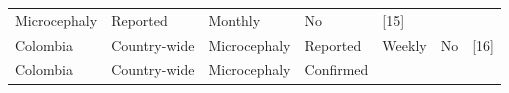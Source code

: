 \documentclass[10pt,letterpaper]{article}
\begin{document}
\begin{longtable}[]{@{}lllllll@{}}
\begin{minipage}[t]{0.08\columnwidth}
Microcephaly\strut
\end{minipage} & \begin{minipage}[t]{0.17\columnwidth}\raggedright\strut
Reported\strut
\end{minipage} & \begin{minipage}[t]{0.04\columnwidth}\raggedright\strut
Monthly\strut
\end{minipage} & \begin{minipage}[t]{0.04\columnwidth}\raggedright\strut
No\strut
\end{minipage} & \begin{minipage}[t]{0.08\columnwidth}\raggedright\strut
{[}15{]}\strut
\end{minipage}\tabularnewline
\begin{minipage}[t]{0.03\columnwidth}\raggedright\strut
Colombia\strut
\end{minipage} & \begin{minipage}[t]{0.37\columnwidth}\raggedright\strut
Country-wide\strut
\end{minipage} & \begin{minipage}[t]{0.08\columnwidth}\raggedright\strut
Microcephaly\strut
\end{minipage} & \begin{minipage}[t]{0.17\columnwidth}\raggedright\strut
Reported\strut
\end{minipage} & \begin{minipage}[t]{0.04\columnwidth}\raggedright\strut
Weekly\strut
\end{minipage} & \begin{minipage}[t]{0.04\columnwidth}\raggedright\strut
No\strut
\end{minipage} & \begin{minipage}[t]{0.08\columnwidth}\raggedright\strut
{[}16{]}\strut
\end{minipage}\tabularnewline
\begin{minipage}[t]{0.03\columnwidth}\raggedright\strut
Colombia\strut
\end{minipage} & \begin{minipage}[t]{0.37\columnwidth}\raggedright\strut
Country-wide\strut
\end{minipage} & \begin{minipage}[t]{0.08\columnwidth}\raggedright\strut
Microcephaly\strut
\end{minipage} & \begin{minipage}[t]{0.17\columnwidth}\raggedright\strut
Confirmed\strut
\end{minipage} & \begin{minipage}[t]{0.04\columnwidth}\raggedright\strut

\end{minipage}
\end{longtable}
\end{document}
